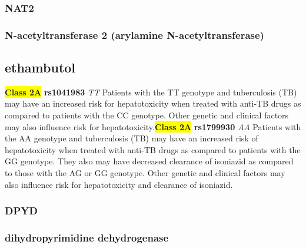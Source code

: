 \documentclass{book}
\begin{document}
\subsubsection{ NAT2 }
\subsubsection{ N-acetyltransferase 2 (arylamine N-acetyltransferase) }

\subsection{ ethambutol }


\begin{center}


\textbf{\colorbox{yellow} {Class 2A}} \textbf{ rs1041983 } \textit{ TT }
Patients with the TT genotype and tuberculosis (TB) may have an increased risk for hepatotoxicity when treated with anti-TB drugs as compared to patients with the CC genotype. Other genetic and clinical factors may also influence risk for hepatotoxicity.\textbf{\colorbox{yellow} {Class 2A}} \textbf{ rs1799930 } \textit{ AA }
Patients with the AA genotype and tuberculosis (TB) may have an increased risk of hepatotoxicity when treated with anti-TB drugs as compared to patients with the GG genotype. They also may have decreased clearance of isoniazid as compared to those with the AG or GG genotype. Other genetic and clinical factors may also influence risk for hepatotoxicity and clearance of isoniazid.


\end{center}


































\subsubsection{ DPYD }
\subsubsection{ dihydropyrimidine dehydrogenase }
\end{document}
